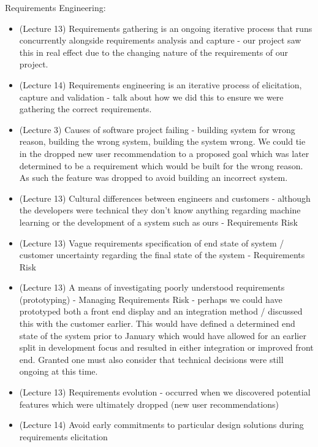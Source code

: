\documentclass{l3proj}
\begin{document}
Requirements Engineering:
\begin{itemize}
\item (Lecture 13) Requirements gathering is an ongoing iterative process that runs concurrently alongside requirements analysis and capture - our project saw this in real effect due to the changing nature of the requirements of our project.
\item (Lecture 14) Requirements engineering is an iterative process of elicitation, capture and validation - talk about how we did this to ensure we were gathering the correct requirements.
\item (Lecture 3) Causes of software project failing - building system for wrong reason, building the wrong system, building the system wrong. We could tie in the dropped new user recommendation to a proposed goal which was later determined to be a requirement which would be built for the wrong reason. As such the feature was dropped to avoid building an incorrect system.
\item (Lecture 13) Cultural differences between engineers and customers - although the developers were technical they don’t know anything regarding machine learning or the development of a system such as ours - Requirements Risk
\item (Lecture 13) Vague requirements specification of end state of system / customer uncertainty regarding the final state of the system - Requirements Risk
\item (Lecture 13) A means of investigating poorly understood requirements (prototyping) - Managing Requirements Risk - perhaps we could have prototyped both a front end display and an integration method / discussed this with the customer earlier. This would have defined a determined end state of the system prior to January which would have allowed for an earlier split in development focus and resulted in either integration or improved front end. Granted one must also consider that technical decisions were still ongoing at this time.
\item (Lecture 13) Requirements evolution - occurred when we discovered potential features which were ultimately dropped (new user recommendations)
\item (Lecture 14) Avoid early commitments to particular design solutions during requirements elicitation
\end{itemize}
\end{document}
